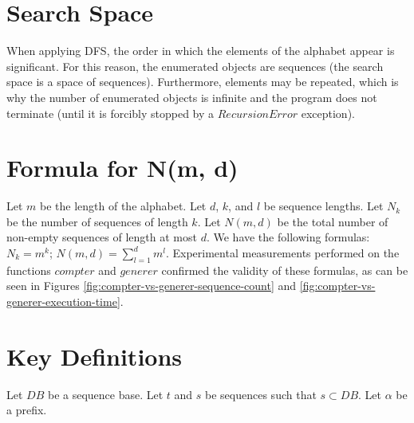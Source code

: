 \documentclass[11pt,a4paper]{article}
\begin{document}
\section*{Search Space}

When applying DFS, the order in which the elements of the alphabet appear is significant. For this reason, the enumerated objects are sequences (the search space is a space of sequences). Furthermore, elements may be repeated, which is why the number of enumerated objects is infinite and the program does not terminate (until it is forcibly stopped by a $RecursionError$ exception).


\section*{Formula for N(m, d)}

Let $m$ be the length of the alphabet. Let $d$, $k$, and $l$ be sequence lengths. Let $N_{k}$ be the number of sequences of length $k$. Let $N(m, d)$ be the total number of non-empty sequences of length at most $d$. We have the following formulas: $N_{k} = m^{k}$; $N(m, d) = \sum_{l=1}^{d} m^{l}$. Experimental measurements performed on the functions $compter$ and $generer$ confirmed the validity of these formulas, as can be seen in Figures \ref{fig:compter-vs-generer-sequence-count} and \ref{fig:compter-vs-generer-execution-time}.


\section*{Key Definitions}

Let $DB$ be a sequence base. Let $t$ and $s$ be sequences such that $s \subset DB$. Let $\alpha$ be a prefix.
\end{document}
